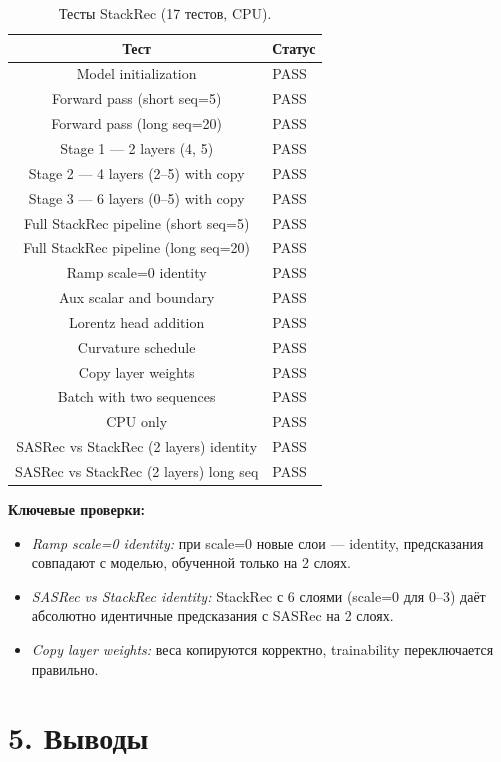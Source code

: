 \documentclass[11pt,a4paper]{article}
\begin{document}
\begin{table}[H]
\centering
\small
\begin{tabular}{cl}
\toprule
Тест & Статус \\
\midrule
Model initialization & PASS \\
Forward pass (short seq=5) & PASS \\
Forward pass (long seq=20) & PASS \\
Stage 1 — 2 layers (4, 5) & PASS \\
Stage 2 — 4 layers (2--5) with copy & PASS \\
Stage 3 — 6 layers (0--5) with copy & PASS \\
Full StackRec pipeline (short seq=5) & PASS \\
Full StackRec pipeline (long seq=20) & PASS \\
Ramp scale=0 identity & PASS \\
Aux scalar and boundary & PASS \\
Lorentz head addition & PASS \\
Curvature schedule & PASS \\
Copy layer weights & PASS \\
Batch with two sequences & PASS \\
CPU only & PASS \\
SASRec vs StackRec (2 layers) identity & PASS \\
SASRec vs StackRec (2 layers) long seq & PASS \\
\bottomrule
\end{tabular}
\caption{Тесты StackRec (17 тестов, CPU).}
\end{table}

\textbf{Ключевые проверки:}
\begin{itemize}
  \item \textit{Ramp scale=0 identity:} при scale=0 новые слои — identity,
        предсказания совпадают с моделью, обученной только на 2 слоях.
  \item \textit{SASRec vs StackRec identity:} StackRec с 6 слоями (scale=0
        для 0--3) даёт абсолютно идентичные предсказания с SASRec на 2 слоях.
  \item \textit{Copy layer weights:} веса копируются корректно,
        trainability переключается правильно.
\end{itemize}

\section*{5. Выводы}
\end{document}
